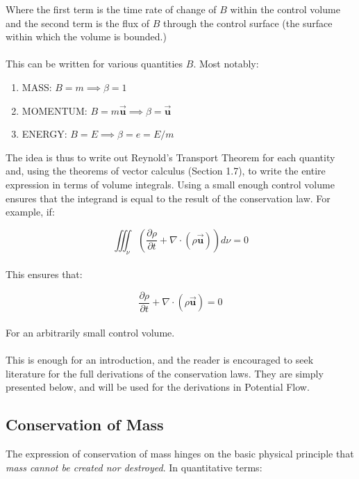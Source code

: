 \documentclass[11pt]{article}
\begin{document}
\noindent
Where the first term is the time rate of change of $B$ within the control volume and the second term is the flux of $B$ through the control surface (the surface within which the volume is bounded.) \\ \\
This can be written for various quantities $B$. Most notably:
\begin{enumerate}
    \item MASS: $B = m \implies \beta = 1$ \\
    \item MOMENTUM: $B = m\vec{\bm{u}} \implies \beta = \vec{\bm{u}}$ \\
    \item ENERGY: $B = E \implies \beta = e = E/m$ \\
\end{enumerate}
The idea is thus to write out Reynold's Transport Theorem for each quantity and, using the theorems of vector calculus (Section 1.7), to write the entire expression in terms of volume integrals. Using a small enough control volume ensures that the integrand is equal to the result of the conservation law. For example, if:

\begin{equation*}
    \iiint_{\nu}\left(\frac{\partial\rho}{\partial t} + \nabla \cdot (\rho\vec{\bm{u}})\right)d\nu = 0
\end{equation*}\\
\noindent
This ensures that:

\begin{equation*}
    \frac{\partial\rho}{\partial t} + \nabla \cdot (\rho\vec{\bm{u}}) = 0
\end{equation*}\\
\noindent
For an arbitrarily small control volume.\\ \\
\noindent
This is enough for an introduction, and the reader is encouraged to seek literature for the full derivations of the conservation laws. They are simply presented below, and will be used for the derivations in Potential Flow.

\subsection{Conservation of Mass}
The expression of conservation of mass hinges on the basic physical principle that \emph{mass cannot be created nor destroyed}. In quantitative terms:
\end{document}

